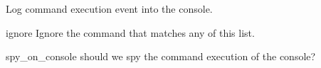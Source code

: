 Log command execution event into the console.

\begin{Configuration}

    \item[ignore]{Ignore the command that matches any of this list.}

    \item[spy\_on\_console]{should we spy the command execution of the console?}

\end{Configuration}

